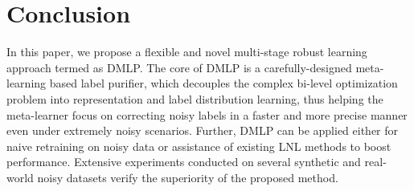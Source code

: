 \documentclass[10pt,twocolumn,letterpaper]{article}
\begin{document}
\begin{table}[]
\begin{minipage}{1.0\linewidth}
\vspace{1em}
    \caption{
       {Comparison between recent} semi-supervised methods {and DMLP-DivideMix} on CIFAR-10/100 with  noisy ratio.} 
    \vspace{-1em}
    \centering 
    \vspace{-3mm}
    \label{tab:ablation_semi} 
\end{minipage}
\end{table}





\section{Conclusion}
In this paper, we propose a flexible and novel multi-stage robust learning approach {termed as} DMLP. The core of DMLP is a carefully-designed meta-learning based label purifier, which decouples {the complex bi-level optimization problem into} representation and label distribution learning, {thus helping} the meta-learner focus on correcting noisy labels in a faster and more precise manner even under extremely noisy scenarios. Further, DMLP can be applied either for naive retraining on noisy data or assistance of existing LNL methods to boost performance.
Extensive experiments conducted on several synthetic and real-world noisy datasets verify the superiority of the proposed method.





{\small


}
\end{document}
